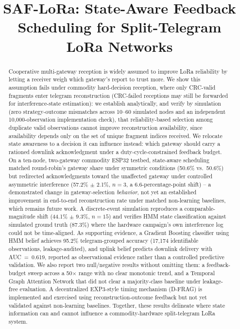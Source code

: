 \documentclass[journal]{IEEEtran}
\begin{document}
\title{SAF-LoRa: State-Aware Feedback Scheduling for Split-Telegram LoRa Networks}

\author{
}

\maketitle

\begin{abstract}
Cooperative multi-gateway reception is widely assumed to improve LoRa reliability by letting a receiver weigh which gateway's report to trust more. We show this assumption fails under commodity hard-decision reception, where only CRC-valid fragments enter telegram reconstruction (CRC-failed receptions may still be forwarded for interference-state estimation): we establish analytically, and verify by simulation (zero strategy-outcome mismatches across 10--60 simulated nodes and an independent 10{,}000-observation implementation check), that reliability-based selection among duplicate valid observations cannot improve reconstruction availability, since availability depends only on the set of unique fragment indices received. We relocate state awareness to a decision it can influence instead: which gateway should carry a rationed downlink acknowledgment under a duty-cycle-constrained feedback budget. On a ten-node, two-gateway commodity ESP32 testbed, state-aware scheduling matched round-robin's gateway share under symmetric conditions (50.6\% vs.\ 50.6\%) but redirected acknowledgments toward the unaffected gateway under controlled asymmetric interference (57.2\% $\pm$ 2.1\%, $n=3$, a 6.6-percentage-point shift) -- a demonstrated change in gateway-selection \emph{behavior}, not yet an established improvement in end-to-end reconstruction rate under matched non-learning baselines, which remains future work. A discrete-event simulation reproduces a comparable-magnitude shift (44.1\% $\pm$ 9.3\%, $n=15$) and verifies HMM state classification against simulated ground truth (87.3\%) where the hardware campaign's own interference log could not be time-aligned. As supporting evidence, a Gradient Boosting classifier using HMM belief achieves 95.2\% telegram-grouped accuracy (17{,}174 identifiable observations, leakage-audited), and uplink belief predicts downlink delivery with AUC~=~0.619, reported as observational evidence rather than a controlled predictive validation. We also report two null/negative results without omitting them: a feedback-budget sweep across a 50$\times$ range with no clear monotonic trend, and a Temporal Graph Attention Network that did not clear a majority-class baseline under leakage-free evaluation. A decentralized EXP3-style timing mechanism (D-FRAG) is implemented and exercised using reconstruction-outcome feedback but not yet validated against non-learning baselines. Together, these results delineate where state information can and cannot influence a commodity-hardware split-telegram LoRa system.
\end{abstract}
\end{document}
